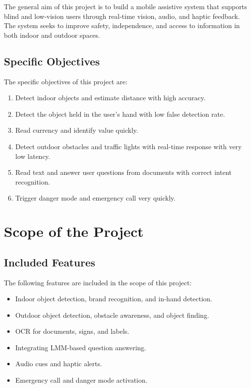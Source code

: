 \documentclass[12pt,a4paper]{report}
\begin{document}
The general aim of this project is to build a mobile assistive system that supports blind and low-vision users through real-time vision, audio, and haptic feedback. The system seeks to improve safety, independence, and access to information in both indoor and outdoor spaces.

\subsection{Specific Objectives}

The specific objectives of this project are:

\begin{enumerate}
  \item Detect indoor objects and estimate distance with high accuracy.
  \item Detect the object held in the user's hand with low false detection rate.
  \item Read currency and identify value quickly.
  \item Detect outdoor obstacles and traffic lights with real-time response with very low latency.
  \item Read text and answer user questions from documents with correct intent recognition.
  \item Trigger danger mode and emergency call very quickly.
\end{enumerate}

\section{Scope of the Project}

\subsection{Included Features}

The following features are included in the scope of this project:

\begin{itemize}
  \item Indoor object detection, brand recognition, and in-hand detection.
  \item Outdoor object detection, obstacle awareness, and object finding.
  \item OCR for documents, signs, and labels.
  \item Integrating LMM-based question answering.
  \item Audio cues and haptic alerts.
  \item Emergency call and danger mode activation.
\end{itemize}
\end{document}
